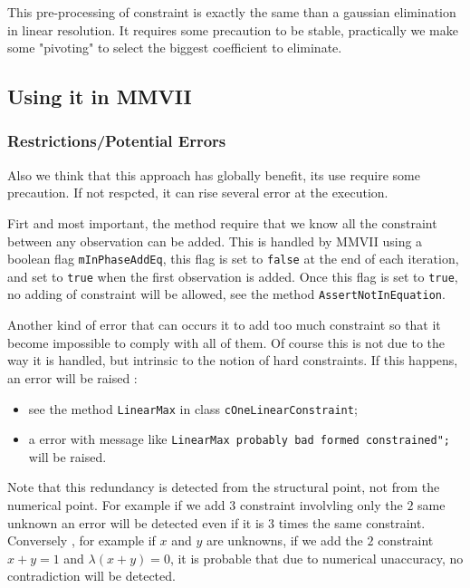 This pre-processing of constraint is exactly the same than a gaussian elimination in linear resolution.
It requires some precaution to be stable, practically we make some "pivoting" to select the biggest coefficient
to eliminate.


\subsection{Using it in MMVII}


\subsubsection{Restrictions/Potential Errors}

Also we think that this approach has globally benefit, its use require some precaution.  
If not respcted, it can rise several error at the execution.

Firt and most important, the method require that we know all the constraint between
any observation can be added.  This is handled by MMVII using a boolean flag {\tt mInPhaseAddEq},
this flag is set to {\tt false}  at the end of each iteration, and set to {\tt true} when
the first observation is added.  Once this flag is set to {\tt true}, no adding of constraint
will be allowed, see the method {\tt AssertNotInEquation}.

Another kind of error that can occurs it to add too much constraint so that it become
impossible to comply with all of them. Of course this is not due to the way it is handled,
but intrinsic to the notion of hard constraints. If this happens, an error
will be raised :

\begin{itemize}
     \item  see the method {\tt LinearMax} in class  {\tt cOneLinearConstraint};
     \item  a error with  message like {\tt LinearMax probably bad formed constrained";} will be raised.
\end{itemize}

Note that this redundancy is detected from the structural point, not from the numerical point. For example
if we add $3$ constraint involvling only the $2$ same unknown an error will be detected even if it is
$3$ times the same constraint.  Conversely , for
example if $x$ and $y$ are unknowns, if we add the $2$ constraint $x+y=1$ and $\lambda(x+y)=0$, it is
probable that due to numerical unaccuracy, no contradiction will be detected.

